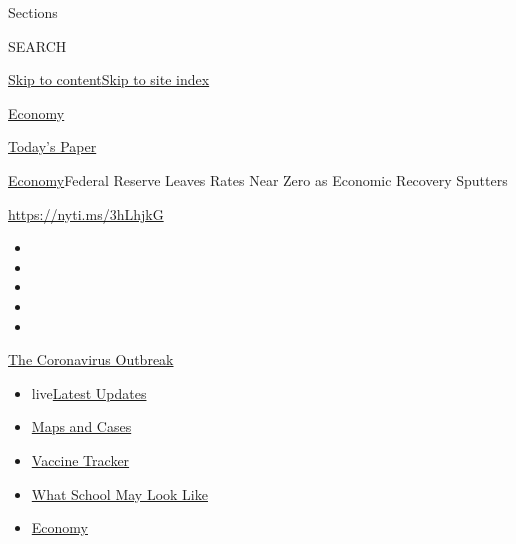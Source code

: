 Sections

SEARCH

\protect\hyperlink{site-content}{Skip to
content}\protect\hyperlink{site-index}{Skip to site index}

\href{https://www.nytimes3xbfgragh.onion/section/business/economy}{Economy}

\href{https://myaccount.nytimes3xbfgragh.onion/auth/login?response_type=cookie\&client_id=vi}{}

\href{https://www.nytimes3xbfgragh.onion/section/todayspaper}{Today's
Paper}

\href{/section/business/economy}{Economy}\textbar{}Federal Reserve
Leaves Rates Near Zero as Economic Recovery Sputters

\url{https://nyti.ms/3hLhjkG}

\begin{itemize}
\item
\item
\item
\item
\item
\end{itemize}

\href{https://www.nytimes3xbfgragh.onion/news-event/coronavirus?action=click\&pgtype=Article\&state=default\&region=TOP_BANNER\&context=storylines_menu}{The
Coronavirus Outbreak}

\begin{itemize}
\tightlist
\item
  live\href{https://www.nytimes3xbfgragh.onion/2020/08/01/world/coronavirus-covid-19.html?action=click\&pgtype=Article\&state=default\&region=TOP_BANNER\&context=storylines_menu}{Latest
  Updates}
\item
  \href{https://www.nytimes3xbfgragh.onion/interactive/2020/us/coronavirus-us-cases.html?action=click\&pgtype=Article\&state=default\&region=TOP_BANNER\&context=storylines_menu}{Maps
  and Cases}
\item
  \href{https://www.nytimes3xbfgragh.onion/interactive/2020/science/coronavirus-vaccine-tracker.html?action=click\&pgtype=Article\&state=default\&region=TOP_BANNER\&context=storylines_menu}{Vaccine
  Tracker}
\item
  \href{https://www.nytimes3xbfgragh.onion/interactive/2020/07/29/us/schools-reopening-coronavirus.html?action=click\&pgtype=Article\&state=default\&region=TOP_BANNER\&context=storylines_menu}{What
  School May Look Like}
\item
  \href{https://www.nytimes3xbfgragh.onion/live/2020/07/31/business/stock-market-today-coronavirus?action=click\&pgtype=Article\&state=default\&region=TOP_BANNER\&context=storylines_menu}{Economy}
\end{itemize}

